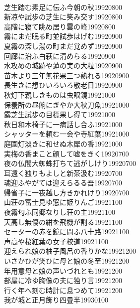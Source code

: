 \begin{multicols}{2}
\\芝生踏む素足に伝ふ今朝の秋\hfill{19920800}
\\新凉や試歩の芝生に笑み交す\hfill{19920800}
\\高階に寝て眺め居り雲の峰\hfill{19920800}
\\霧にまだ眠る町並試歩はげむ\hfill{19920900}
\\夏霧の深し湯の町まだ覚めず\hfill{19920900}
\\回廊に沿ふ白萩に清めらる\hfill{19920900}
\\水攻めの城跡や蓮の実の大粒\hfill{19920900}
\\苗木より三年無花果三つ熟れる\hfill{19920900}
\\長生きに想ひいろいろ敬老日\hfill{19920900}
\\秋灯下親しきものは虫眼鏡\hfill{19921000}
\\保養所の昼餉にぎやか大秋刀魚\hfill{19921000}
\\露芝生試歩の目標果し得て\hfill{19921000}
\\秋日和木椅子に一病話し合ふ\hfill{19921000}
\\シャッターを頼む一会や寺紅葉\hfill{19921000}
\\庭園灯淡きに和せぬ木犀の香\hfill{19921000}
\\実梅の香まこと顔して嘘をきく\hfill{19920700}
\\夜の仏間大蜘蛛打ちて逃がしけり\hfill{19920700}
\\耳遠く独りもよしと新茶汲む\hfill{19920700}
\\魂迎ふやがては迎えらるる吾\hfill{19920700}
\\帰省子に一夜越し方きかれけり\hfill{19920700}
\\山荘の冨士見ゆ窓に姫りんご\hfill{19921100}
\\夜霧匂ふ同郷なりし荘の主\hfill{19921100}
\\天高し無傷の紺を飛機が割る\hfill{19921100}
\\セーターの赤を鏡に問ふ八十路\hfill{19921100}
\\声高や桜紅葉の女子校道\hfill{19921100}
\\迎えられ娘の柚子風呂の香りかな\hfill{19921200}
\\いさかひが笑ひに母と娘の冬至\hfill{19921200}
\\年用意母と娘の声いづれとも\hfill{19921200}
\\部屋に冷ゆ胸像の夫に独り言\hfill{19921200}
\\行く年へ刻む時計に息つめて\hfill{19921200}
\\我が城と正月飾り四畳半\hfill{19930100}

\end{multicols}
